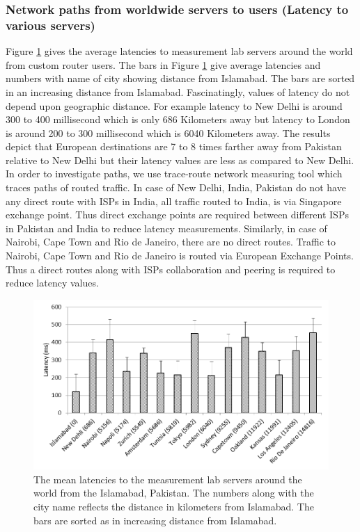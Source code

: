 \documentclass{sig-alternate-10pt}
\begin{document}
\subsubsection {Network paths from worldwide servers to users (Latency to various servers)}
Figure \ref{Fig:13} gives the average latencies to measurement lab servers around the world from custom router users. The bars in Figure \ref{Fig:13} give average latencies and numbers with name of city showing distance from Islamabad. The bars are sorted in an increasing distance from Islamabad. Fascinatingly, values of latency do not depend upon geographic distance. For example latency to New Delhi is around 300 to 400 millisecond which is only 686 Kilometers away but latency to London is around 200 to 300 millisecond which is 6040 Kilometers away. The results depict that European destinations are 7 to 8 times farther away from Pakistan relative to New Delhi but their latency values are less as compared to New Delhi. In order to investigate paths, we use trace-route network measuring tool which traces paths of routed traffic. In case of New Delhi, India, Pakistan do not have any direct route with ISPs in India, all traffic routed to India, is via Singapore exchange point. Thus direct exchange points are required between different ISPs in Pakistan and India to reduce latency measurements. Similarly, in case of Nairobi, Cape Town and Rio de Janeiro, there are no direct routes. Traffic to Nairobi, Cape Town and Rio de Janeiro is routed via European Exchange Points. Thus a direct routes along with ISPs collaboration and peering is required to reduce latency values.
 \begin{figure}[h!]
\begin {center}
   \includegraphics[height=0.2 \textheight,width=0.5 \textwidth]{12.png}
   \end {center}
 \caption{The mean latencies to the measurement lab servers around the world from the Islamabad, Pakistan. The numbers along with the city name reflects the distance in kilometers from Islamabad. The bars are sorted as in increasing distance from Islamabad.}
 \label{Fig:13}
\end{figure}
\end{document}
